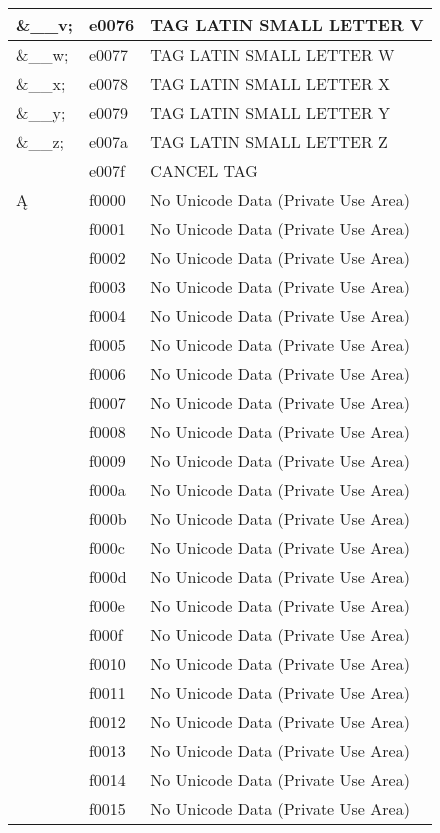 \documentclass[12pt,letterpaper,openany]{book}
\newcommand{\cvd}[3][0]{{\addfontfeature{CharacterVariant=#2:#1}#3}}
\begin{document}
\begin{center}
\begin{supertabular}{|m{0.25in}|m{0.5in}|m{4in}|}
\&\_\_v; & e0076 & TAG LATIN SMALL LETTER V\\\hline
\&\_\_w; & e0077 & TAG LATIN SMALL LETTER W\\\hline
\&\_\_x; & e0078 & TAG LATIN SMALL LETTER X\\\hline
\&\_\_y; & e0079 & TAG LATIN SMALL LETTER Y\\\hline
\&\_\_z; & e007a & TAG LATIN SMALL LETTER Z\\\hline
󠁿 & e007f & CANCEL TAG\\\hline
\cvd{53}{Ą} & f0000 & No Unicode Data (Private Use Area)\\\hline
󰀁 & f0001 & No Unicode Data (Private Use Area)\\\hline
󰀂 & f0002 & No Unicode Data (Private Use Area)\\\hline
󰀃 & f0003 & No Unicode Data (Private Use Area)\\\hline
󰀄 & f0004 & No Unicode Data (Private Use Area)\\\hline
󰀅 & f0005 & No Unicode Data (Private Use Area)\\\hline
󰀆 & f0006 & No Unicode Data (Private Use Area)\\\hline
󰀇 & f0007 & No Unicode Data (Private Use Area)\\\hline
󰀈 & f0008 & No Unicode Data (Private Use Area)\\\hline
󰀉 & f0009 & No Unicode Data (Private Use Area)\\\hline
󰀊 & f000a & No Unicode Data (Private Use Area)\\\hline
󰀋 & f000b & No Unicode Data (Private Use Area)\\\hline
󰀌 & f000c & No Unicode Data (Private Use Area)\\\hline
󰀍 & f000d & No Unicode Data (Private Use Area)\\\hline
󰀎 & f000e & No Unicode Data (Private Use Area)\\\hline
󰀏 & f000f & No Unicode Data (Private Use Area)\\\hline
󰀐 & f0010 & No Unicode Data (Private Use Area)\\\hline
󰀑 & f0011 & No Unicode Data (Private Use Area)\\\hline
󰀒 & f0012 & No Unicode Data (Private Use Area)\\\hline
󰀓 & f0013 & No Unicode Data (Private Use Area)\\\hline
󰀔 & f0014 & No Unicode Data (Private Use Area)\\\hline
󰀕 & f0015 & No Unicode Data (Private Use Area)\\\hline

\end{supertabular}
\end{center}
\end{document}
